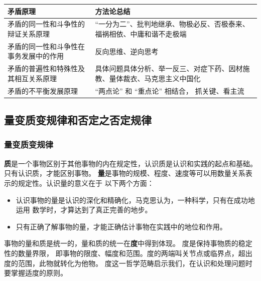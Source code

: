 \documentclass[11pt, UTF8]{book} %
\begin{document}
{ %
\label{矛盾分析方法} %
\begin{longtable}{p{}p{}}
    \toprule
    \textbf{矛盾原理} & \textbf{方法论总结} \\
    \toprule
    \endhead
    \bottomrule
    \endfoot

    矛盾的同一性和斗争性的辩证关系原理 & “一分为二”、批判地继承、物极必反、否极泰来、福祸相依、中庸和谐不走极端 \\ 
    矛盾的同一性和斗争性在事务发展中的作用 & 反向思维、逆向思考 \\ 
    矛盾的普遍性和特殊性及其相互关系原理 & 具体问题具体分析、举一反三、对症下药、因材施教、量体裁衣、马克思主义中国化 \\ 
    矛盾的不平衡发展原理 & “两点论” 和 “重点论” 相结合， 抓关键、看主流 \\
\end{longtable}}

\subsection{量变质变规律和否定之否定规律}

\subsubsection{量变质变规律}

\textbf{质}是一个事物区别于其他事物的内在规定性，认识质是认识和实践的起点和基础。
只有认识质，才能区别事物。
\textbf{量}是事物的规模、程度、速度等可以用数量关系表示的规定性。认识量的意义在于
以下两个方面：
\begin{itemize}[itemsep=0pt]
    \item 认识事物的量是认识的深化和精确化，马克思认为，一种科学，只有在成功地运用
    数学时，才算达到了真正完善的地步。
    \item 只有正确了解事物的量，才能正确估计事物在实践中的地位和作用。
\end{itemize}

事物的量和质是统一的，量和质的统一在\textbf{度}中得到体现。
度是保持事物质的稳定性的数量界限，
即事物的限度、幅度和范围。度的两端叫关节点或临界点，超出度的范围，此物就转化为他物。
度这一哲学范畴启示我们，在认识和处理问题时要掌握适度的原则。
\end{document}
